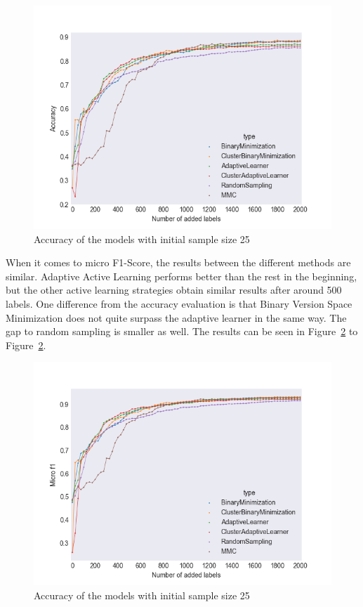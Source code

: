 \begin{figure}[h!]
    \centering
    \includegraphics[scale=0.5]{figures/al-25-accuracy.png}
    \caption{Accuracy of the models with initial sample size 25}
    \label{fig:al-accuracy-25}
\end{figure}

When it comes to micro F1-Score, the results between the different methods are similar.
Adaptive Active Learning performs better than the rest in the beginning, but the other active learning strategies obtain similar results after around 500 labels.
One difference from the accuracy evaluation is that Binary Version Space Minimization does not quite surpass the adaptive learner in the same way.
The gap to random sampling is smaller as well.
The results can be seen in Figure~\ref{fig:al-micro-f1-25} to Figure~\ref{fig:al-micro-f1-25}.

\begin{figure}
    \centering
    \includegraphics[scale=0.5]{figures/al-25-micro-f1.png}
    \caption{Accuracy of the models with initial sample size 25}
    \label{fig:al-micro-f1-25}
\end{figure}

